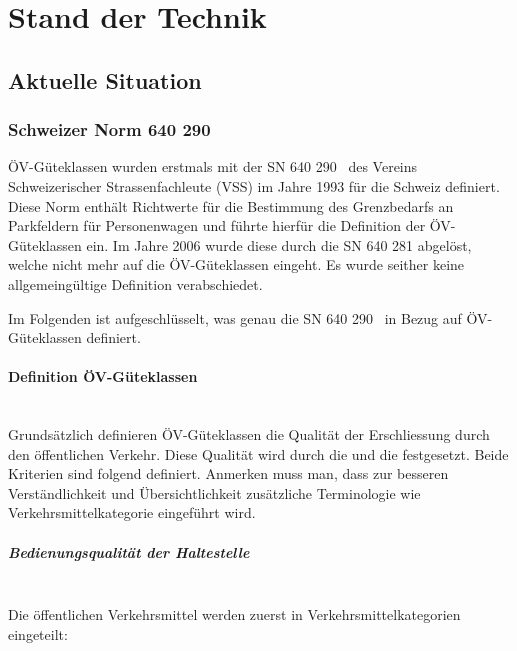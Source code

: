
\section{Stand der Technik}
\label{Stand der Technik}

\subsection{Aktuelle Situation}
\label{Stand der Technik:Aktuelle Situation}

\subsubsection{Schweizer Norm 640 290}
\label{Aktuelle Situation:Schweizer Norm 640 290}

\acs{ÖV}-Güteklassen wurden erstmals mit der \ac{SN} 640 290~\cite{sn640290} des Vereins Schweizerischer Strassenfachleute (VSS) im Jahre 1993 für die Schweiz definiert.
Diese Norm enthält Richtwerte für die Bestimmung des Grenzbedarfs an Parkfeldern für Personenwagen und führte hierfür die Definition der \acs{ÖV}-Güteklassen ein.
Im Jahre 2006 wurde diese durch die \acs{SN} 640 281 abgelöst, welche nicht mehr auf die \acs{ÖV}-Güteklassen eingeht.
Es wurde seither keine allgemeingültige Definition verabschiedet.

Im Folgenden ist aufgeschlüsselt, was genau die \acs{SN} 640 290~\cite{sn640290} in Bezug auf \acs{ÖV}-Güteklassen definiert.

\paragraph{Definition ÖV-Güteklassen}~\\
\label{Schweizer Norm 640 290:Definition ÖV-Güteklassen}
Grundsätzlich definieren \acs{ÖV}-Güteklassen die Qualität der Erschliessung durch den öffentlichen Verkehr.
Diese Qualität wird durch die  und die  festgesetzt.
Beide Kriterien sind folgend definiert.
Anmerken muss man, dass zur besseren Verständlichkeit und Übersichtlichkeit zusätzliche Terminologie wie Verkehrsmittelkategorie eingeführt wird.

\subparagraph{Bedienungsqualität der Haltestelle}~\\
\label{Definition ÖV-Güteklassen:Bedienungsqualität der Haltestelle}
Die öffentlichen Verkehrsmittel werden zuerst in Verkehrsmittelkategorien eingeteilt:

